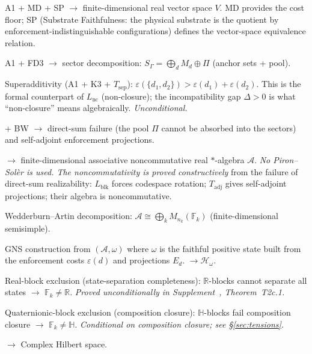 \documentclass[11pt]{article}
\begin{document}
\begin{description}[nosep,leftmargin=2em]
\item[$T_{\mathrm{form}}$] A1 + MD + SP $\to$ finite-dimensional real vector space $V$.  MD provides the cost floor; SP (Substrate Faithfulness: the physical substrate is the quotient by enforcement-indistinguishable configurations) defines the vector-space equivalence relation.
\item[$T_{\mathrm{sep}}$] A1 + FD3 $\to$ sector decomposition: $S_\Gamma = \bigoplus_d M_d \oplus \Pi$ (anchor sets + pool).
\item[$L_\Delta$] Superadditivity (A1 + K3 + $T_{\mathrm{sep}}$): $\varepsilon(\{d_1, d_2\}) > \varepsilon(d_1) + \varepsilon(d_2)$.  This is the formal counterpart of $L_{\mathrm{nc}}$ (non-closure); the incompatibility gap $\Delta > 0$ is what ``non-closure'' means algebraically.  \textit{Unconditional.}
\item[$L_{\mathrm{blk}} + T_{\mathrm{adj}}$] + BW $\to$ direct-sum failure (the pool $\Pi$ cannot be absorbed into the sectors) and self-adjoint enforcement projections.
\item[$T_{\mathrm{alg}}$] $\to$ finite-dimensional associative noncommutative real $*$-algebra $\mathcal{A}$.  \textit{No Piron--Sol\`er is used.  The noncommutativity is proved constructively} from the failure of direct-sum realizability: $L_{\mathrm{blk}}$ forces codespace rotation; $T_{\mathrm{adj}}$ gives self-adjoint projections; their algebra is noncommutative.
\item[$T_{2a}$] Wedderburn--Artin decomposition: $\mathcal{A} \cong \bigoplus_k M_{n_k}(\mathbb{F}_k)$ (finite-dimensional semisimple).
\item[$T_{\mathrm{GNS}}$] GNS construction from $(\mathcal{A}, \omega)$ where $\omega$ is the faithful positive state built from the enforcement costs $\varepsilon(d)$ and projections $E_d$.  $\to \mathcal{H}_\omega$.
\item[T2c.1] Real-block exclusion (state-separation completeness): $\mathbb{R}$-blocks cannot separate all states $\to$ $\mathbb{F}_k \ne \mathbb{R}$.  \textit{Proved unconditionally in Supplement~\cite{Supp}, Theorem~T2c.1.}
\item[T2c.2] Quaternionic-block exclusion (composition closure): $\mathbb{H}$-blocks fail composition closure $\to$ $\mathbb{F}_k \ne \mathbb{H}$.  \textit{Conditional on composition closure; see §\ref{sec:tensions}.}
\item[$\mathbb{F} = \mathbb{C}$] $\to$ Complex Hilbert space.
\end{description}
\end{document}
